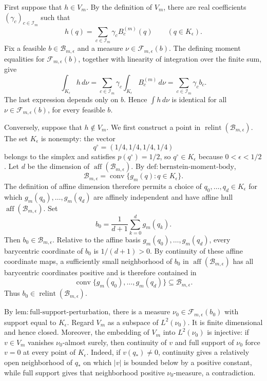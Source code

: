 First suppose that \(h\in V_m\). By the definition of \(V_m\), there are real coefficients \((\gamma_c)_{c\in\mathcal I_m}\) such that
\[
h(q)=\sum_{c\in\mathcal I_m}\gamma_c B_c^{(m)}(q)
\qquad(q\in K_{\epsilon}).
\]
Fix a feasible \(b\in\mathcal B_{m,\epsilon}\) and a measure \(\nu\in\mathcal F_{m,\epsilon}(b)\). The defining moment equalities for \(\mathcal F_{m,\epsilon}(b)\), together with linearity of integration over the finite sum, give
\[
\int_{K_{\epsilon}}h\,d\nu
=\sum_{c\in\mathcal I_m}\gamma_c
  \int_{K_{\epsilon}}B_c^{(m)}\,d\nu
=\sum_{c\in\mathcal I_m}\gamma_c b_c.
\]
The last expression depends only on \(b\). Hence \(\int h\,d\nu\) is identical for all \(\nu\in\mathcal F_{m,\epsilon}(b)\), for every feasible \(b\).

Conversely, suppose that \(h\notin V_m\). We first construct a point in \(\operatorname{relint}(\mathcal B_{m,\epsilon})\). The set \(K_{\epsilon}\) is nonempty: the vector
\[
q^{\circ}=(1/4,1/4,1/4,1/4)
\]
belongs to the simplex and satisfies \(p(q^{\circ})=1/2\), so \(q^{\circ}\in K_{\epsilon}\) because \(0<\epsilon<1/2\). Let \(d\) be the dimension of \(\operatorname{aff}(\mathcal B_{m,\epsilon})\). By \(\mathrm{def{:}bernstein\text{-}moment\text{-}body}\),
\[
\mathcal B_{m,\epsilon}
=\operatorname{conv}\{g_m(q):q\in K_{\epsilon}\}.
\]
The definition of affine dimension therefore permits a choice of \(q_0,\ldots,q_d\in K_{\epsilon}\) for which \(g_m(q_0),\ldots,g_m(q_d)\) are affinely independent and have affine hull \(\operatorname{aff}(\mathcal B_{m,\epsilon})\). Set
\[
b_0=\frac{1}{d+1}\sum_{k=0}^{d}g_m(q_k).
\]
Then \(b_0\in\mathcal B_{m,\epsilon}\). Relative to the affine basis \(g_m(q_0),\ldots,g_m(q_d)\), every barycentric coordinate of \(b_0\) is \(1/(d+1)>0\). By continuity of these affine coordinate maps, a sufficiently small neighborhood of \(b_0\) in \(\operatorname{aff}(\mathcal B_{m,\epsilon})\) has all barycentric coordinates positive and is therefore contained in
\[
\operatorname{conv}\{g_m(q_0),\ldots,g_m(q_d)\}
\subseteq\mathcal B_{m,\epsilon}.
\]
Thus \(b_0\in\operatorname{relint}(\mathcal B_{m,\epsilon})\).

By \(\mathrm{lem{:}full\text{-}support\text{-}perturbation}\), there is a measure \(\nu_0\in\mathcal F_{m,\epsilon}(b_0)\) with support equal to \(K_{\epsilon}\). Regard \(V_m\) as a subspace of \(L^2(\nu_0)\). It is finite dimensional and hence closed. Moreover, the embedding of \(V_m\) into \(L^2(\nu_0)\) is injective: if \(v\in V_m\) vanishes \(\nu_0\)-almost surely, then continuity of \(v\) and full support of \(\nu_0\) force \(v=0\) at every point of \(K_{\epsilon}\). Indeed, if \(v(q_*)\ne0\), continuity gives a relatively open neighborhood of \(q_*\) on which \(|v|\) is bounded below by a positive constant, while full support gives that neighborhood positive \(\nu_0\)-measure, a contradiction.

